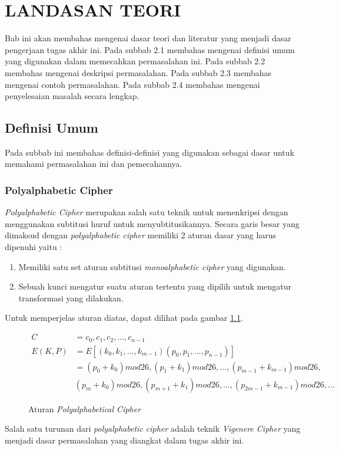 
	\chapter{LANDASAN TEORI}
	Bab ini akan membahas mengenai dasar teori dan literatur yang menjadi dasar pengerjaan tugas akhir ini. Pada subbab 2.1 membahas mengenai definisi umum yang digunakan dalam memecahkan permasalahan ini. Pada subbab 2.2 membahas mengenai deskripsi permasalahan. Pada subbab 2.3 membahas mengenai contoh permasalahan. Pada subbab 2.4 membahas mengenai penyelesaian masalah secara lengkap.
	\section{Definisi Umum}
	Pada subbab ini membahas definisi-definisi yang digunakan sebagai dasar untuk memahami permasalahan ini dan pemecahannya.	
	\subsection{Polyalphabetic Cipher}
	\textit{Polyalphabetic Cipher }merupakan salah satu teknik untuk menenkripsi dengan menggunakan subtitusi huruf untuk menyubtitusikannya. Secara garis besar yang dimaksud dengan \textit{polyalphabetic cipher} memiliki 2 aturan dasar yang harus dipenuhi yaitu :
	\begin{enumerate}
		\item Memiliki satu set aturan subtitusi \textit{monoalphabetic cipher} yang digunakan.
		\item Sebuah kunci mengatur suatu aturan tertentu yang dipilih untuk mengatur transformasi yang dilakukan.
	\end{enumerate}
	Untuk memperjelas aturan diatas, dapat dilihat pada gambar \ref{fig:polyalphabeticalcipher}.
	\begin{figure}[H]
		\centering
		\begin{align*}
 		C &=c_0,c_1,c_2,...,c_{n-1} \\
      	E(K,P)&=E[(k_0,k_1,...,k_{m-1})(p_0,p_1,...,p_{n-1})] \\
      	&=(p_0+k_0)mod26,(p_1+k_1)mod26,...,(p_{m-1}+k_{m-1})mod26, \\
      		&(p_m+k_0)mod26,(p_{m+1}+k_1)mod26,...,(p_{2m-1}+k_{m-1})mod26,...
		\end{align*}		
		
		\caption{Aturan \textit{Polyalphabetical Cipher}}
		\label{fig:polyalphabeticalcipher}
	\end{figure}
	Salah satu turunan dari \textit{polyalphabetic cipher} adalah teknik \textit{Vigenere Cipher} yang menjadi dasar permasalahan yang diangkat dalam tugas akhir ini\cite{stallings_computer_2015}.
	
